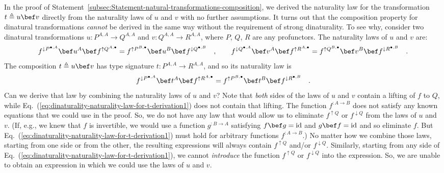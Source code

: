 In the proof of Statement~\ref{subsec:Statement-natural-transformations-composition},
we derived the naturality law for the transformation $t\triangleq u\bef v$
directly from the naturality laws of $u$ and $v$ with no further
assumptions. It turns out that the composition property for dinatural
transformations \emph{cannot} be derived in the same way without the
requirement of strong dinaturality. To see why, consider two dinatural
transformations $u:P^{A,A}\rightarrow Q^{A,A}$ and $v:Q^{A,A}\rightarrow R^{A,A}$,
where $P$, $Q$, $R$ are any profunctors. The naturality laws of
$u$ and $v$ are:
\[
f^{\downarrow P^{\bullet,A}}\bef u^{A}\bef f^{\uparrow Q^{A,\bullet}}=f^{\uparrow P^{B,\bullet}}\bef u^{B}\bef f^{\downarrow Q^{\bullet,B}}\quad,\quad\quad f^{\downarrow Q^{\bullet,A}}\bef v^{A}\bef f^{\uparrow R^{A,\bullet}}=f^{\uparrow Q^{B,\bullet}}\bef v^{B}\bef f^{\downarrow R^{\bullet,B}}\quad.
\]
 The composition $t\triangleq u\bef v$ has type signature $t:P^{A,A}\rightarrow R^{A,A}$,
and so its naturality law is
\begin{equation}
f^{\downarrow P^{\bullet,A}}\bef t^{A}\bef f^{\uparrow R^{A,\bullet}}=f^{\uparrow P^{B,\bullet}}\bef t^{B}\bef f^{\downarrow R^{\bullet,B}}\quad.\label{eq:dinaturality-naturality-law-for-t-derivation1}
\end{equation}
Can we derive that law by combining the naturality laws of $u$ and
$v$? Note that \emph{both} sides of the laws of $u$ and $v$ contain
a lifting of $f$ to $Q$, while Eq.~(\ref{eq:dinaturality-naturality-law-for-t-derivation1})
does not contain that lifting. The function $f^{:A\rightarrow B}$
does not satisfy any known equations that we could use in the proof.
So, we do not have any law that would allow us to eliminate $f^{\uparrow Q}$
or $f^{\downarrow Q}$ from the laws of $u$ and $v$. (If, e.g.,
we knew that $f$ is invertible, we would use a function $g^{:B\rightarrow A}$
satisfying $f\bef g=\text{id}$ and $g\bef f=\text{id}$ and so eliminate
$f$. But Eq.~(\ref{eq:dinaturality-naturality-law-for-t-derivation1})
must hold for arbitrary functions $f^{:A\rightarrow B}$.) No matter
how we combine those laws, starting from one side or from the other,
the resulting expressions will always contain $f^{\uparrow Q}$ and/or
$f^{\downarrow Q}$. Similarly, starting from any side of Eq.~(\ref{eq:dinaturality-naturality-law-for-t-derivation1}),
we cannot \emph{introduce} the function $f^{\uparrow Q}$ or $f^{\downarrow Q}$
into the expression. So, we are unable to obtain an expression in
which we could use the laws of $u$ and $v$. 

